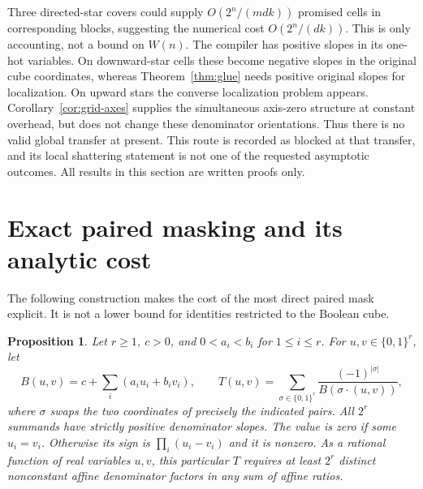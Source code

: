 \documentclass[11pt]{article}
\newtheorem{proposition}[theorem]{Proposition}
\begin{document}
Three directed-star covers could supply $O(2^n/(mdk))$ promised
cells in corresponding blocks, suggesting the numerical cost
$O(2^n/(dk))$. This is only accounting, not a bound on $W(n)$.
The compiler has positive slopes in its one-hot variables. On
downward-star cells these become negative slopes in the original
cube coordinates, whereas Theorem~\ref{thm:glue} needs positive
original slopes for localization. On upward stars the converse
localization problem appears. Corollary~\ref{cor:grid-axes} supplies
the simultaneous axis-zero structure at constant overhead, but does
not change these denominator orientations. Thus there is no valid
global transfer at present. This route is recorded as blocked at that
transfer, and its local shattering statement is not one of the
requested asymptotic outcomes. All results in this section are
written proofs only.

\section{Exact paired masking and its analytic cost}

The following construction makes the cost of the most direct paired
mask explicit. It is not a lower bound for identities restricted to the
Boolean cube.

\begin{proposition}\label{prop:paired-antisymmetry}
Let $r\geq1$, $c>0$, and $0<a_i<b_i$ for $1\leq i\leq r$.
For $u,v\in\{0,1\}^r$, let
\[
 B(u,v)=c+\sum_i(a_i u_i+b_i v_i),\qquad
 T(u,v)=\sum_{\sigma\in\{0,1\}^r}
     \frac{(-1)^{|\sigma|}}{B(\sigma\cdot(u,v))},
\]
where $\sigma$ swaps the two coordinates of precisely the indicated
pairs. All $2^r$ summands have strictly positive denominator slopes.
The value is zero if some $u_i=v_i$. Otherwise its sign is
$\prod_i(u_i-v_i)$ and it is nonzero. As a rational function of real
variables $u,v$, this particular $T$ requires at least $2^r$ distinct
nonconstant affine denominator factors in any sum of affine ratios.
\end{proposition}
\end{document}
